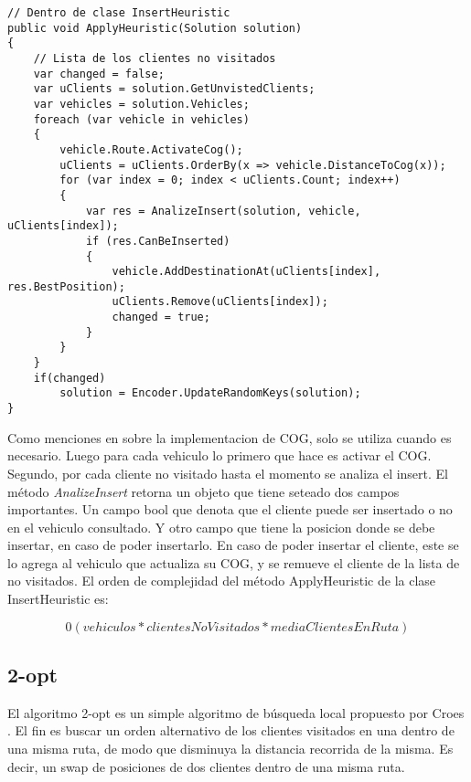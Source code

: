 \begin{minipage}{\textwidth}
\begin{lstlisting}
// Dentro de clase InsertHeuristic
public void ApplyHeuristic(Solution solution)
{
	// Lista de los clientes no visitados
	var changed = false;	
	var uClients = solution.GetUnvistedClients;	
	var vehicles = solution.Vehicles;
	foreach (var vehicle in vehicles)
	{
		vehicle.Route.ActivateCog();
		uClients = uClients.OrderBy(x => vehicle.DistanceToCog(x));	
		for (var index = 0; index < uClients.Count; index++)
		{
			var res = AnalizeInsert(solution, vehicle, uClients[index]);
			if (res.CanBeInserted)
			{
				vehicle.AddDestinationAt(uClients[index], res.BestPosition);
				uClients.Remove(uClients[index]);
				changed = true;
			}
		}
	}
	if(changed)
		solution = Encoder.UpdateRandomKeys(solution);
}
\end{lstlisting}
\end{minipage}

\bigskip

Como menciones en sobre la implementacion de COG, solo se utiliza cuando es necesario. Luego para cada vehiculo lo primero que hace es activar el COG. Segundo, por cada cliente no visitado hasta el momento se analiza el insert. El método \textit{AnalizeInsert} retorna un objeto que tiene seteado dos campos importantes. Un campo bool que denota que el cliente puede ser insertado o no en el vehiculo consultado. Y otro campo que tiene la posicion donde se debe insertar, en caso de poder insertarlo. En caso de poder insertar el cliente, este se lo agrega al vehiculo que actualiza su COG, y se remueve el cliente de la lista de no visitados. El orden de complejidad del método ApplyHeuristic de la clase InsertHeuristic es: 

\begin{equation*}
0(vehiculos * clientesNoVisitados * mediaClientesEnRuta)
\end{equation*}

\subsection{2-opt}

El algoritmo 2-opt es un simple algoritmo de búsqueda local propuesto por Croes \cite{Croes}. El fin es buscar un orden alternativo de los clientes visitados en una dentro de una misma ruta, de modo que disminuya la distancia recorrida de la misma. Es decir, un swap de posiciones de dos clientes dentro de una misma ruta.

